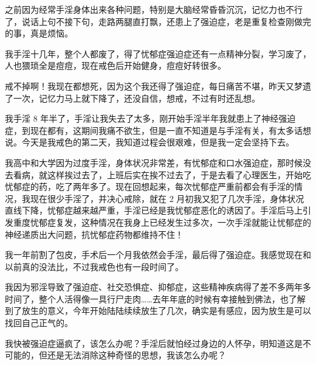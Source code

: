 \begin{case}[强迫症]
    之前因为经常手淫身体出来各种问题，特别是大脑经常昏昏沉沉，记忆力也不行了，说话上句不接下句，走路两腿直打飘，还患上了强迫症，老是重复检查刚做完的事，真是烦恼。
\end{case}

\begin{case}[强迫症]
    我手淫十几年，整个人都废了，得了忧郁症强迫症还有一点精神分裂，学习废了，人也猥琐全是痘痘，现在戒色后开始健身，痘痘好转很多。
\end{case}

\begin{case}[强迫症]
    戒不掉啊！我现在都想死，因为这个我还得了强迫症，每日痛苦不堪，昨天又梦遗了一次，记忆力马上就下降了，还没自信，想戒，不过有时还乱想。
\end{case}

\begin{case}[强迫症]
    我手淫 8 年半了，手淫让我失去了太多，刚开始手淫半年我就患上了神经强迫症，到现在都有，这期间我痛不欲生，但是一直不知道是与手淫有关，有太多话想说。今天是我戒色的第二天，我知道过程会很艰难，但是我一定会坚持下去。
\end{case}

\begin{case}[强迫症]
    我高中和大学因为过度手淫，身体状况非常差，有忧郁症和口水强迫症，那时候没去看病，就这样挨过去了，上班后实在挨不过去了，于是去看了心理医生，开始吃忧郁症的药，吃了两年多了。现在回想起来，每次忧郁症严重前都会有手淫的情况，我现在很少手淫了，并决心戒除，就在 2 月初我又犯了几次手淫，身体状况直线下降，忧郁症越来越严重，手淫已经是我忧郁症恶化的诱因了。手淫后马上引发重度忧郁症复发，这种情况在我身上已经发生过多次，一次手淫就能让忧郁症的神经递质出大问题，抗忧郁症药物都维持不住！
\end{case}

\begin{case}[强迫症]
    我一年前割了包皮，手术后一个月我依然会手淫，最后得了强迫症。我感觉现在和以前真的没法比，不过我戒色也有一段时间了。
\end{case}

\begin{case}[强迫症]
    我因为邪淫导致了强迫症、社交恐惧症、抑郁症，这些精神疾病得了差不多两年多时间了，整个人活得像一具行尸走肉……去年年底的时候有幸接触到佛法，也了解到了放生的意义，今年开始陆陆续续放生了几次，确实是有感应，因为放生是可以找回自己正气的。
\end{case}

\begin{case}[强迫症]
    我快被强迫症逼疯了，该怎么办呢？手淫后就怕经过身边的人怀孕，明知道这是不可能的，但还是无法消除这种奇怪的思想，我该怎么办呢？
\end{case}

